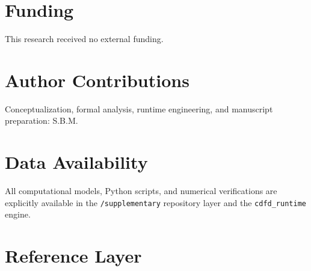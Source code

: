 \documentclass[11pt]{article}
\begin{document}
\section*{Funding} This research received no external funding.
\section*{Author Contributions} Conceptualization, formal analysis, runtime engineering, and manuscript preparation: S.B.M.
\section*{Data Availability} All computational models, Python scripts, and numerical verifications are explicitly available in the \texttt{/supplementary} repository layer and the \texttt{cdfd\_runtime} engine.

\section{Reference Layer}


\end{document}
